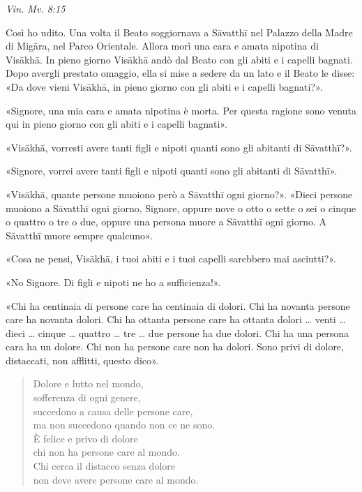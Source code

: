 \emph{Vin. Mv. 8:15}


 Così ho udito. Una volta il Beato soggiornava a Sāvatthī nel
Palazzo della Madre di Migāra, nel Parco Orientale. Allora morì una cara
e amata nipotina di Visākhā. In pieno giorno Visākhā andò dal Beato con
gli abiti e i capelli bagnati. Dopo avergli prestato omaggio, ella si
mise a sedere da un lato e il Beato le disse: «Da dove vieni Visākhā, in
pieno giorno con gli abiti e i capelli bagnati?».


«Signore, una mia cara e amata nipotina è morta. Per questa ragione sono
venuta qui in pieno giorno con gli abiti e i capelli bagnati».


«Visākhā, vorresti avere tanti figli e nipoti quanti sono gli abitanti
di Sāvatthī?».


«Signore, vorrei avere tanti figli e nipoti quanti sono gli abitanti di
Sāvatthī».


«Visākhā, quante persone muoiono però a Sāvatthī ogni giorno?». «Dieci
persone muoiono a Sāvatthī ogni giorno, Signore, oppure nove o otto o
sette o sei o cinque o quattro o tre o due, oppure una persona muore a
Sāvatthī ogni giorno. A Sāvatthī muore sempre qualcuno».


«Cosa ne pensi, Visākhā, i tuoi abiti e i tuoi capelli sarebbero mai
asciutti?».


«No Signore. Di figli e nipoti ne ho a sufficienza!».


«Chi ha centinaia di persone care ha centinaia di dolori. Chi ha novanta
persone care ha novanta dolori. Chi ha ottanta persone care ha ottanta
dolori … venti … dieci … cinque … quattro … tre … due persone ha due
dolori. Chi ha una persona cara ha un dolore. Chi non ha persone care
non ha dolori. Sono privi di dolore, distaccati, non afflitti, questo
dico».


\begin{quote}
Dolore e lutto nel mondo, \\
sofferenza di ogni genere, \\
succedono a causa delle persone care, \\
ma non succedono quando non ce ne sono. \\
È felice e privo di dolore \\
chi non ha persone care al mondo. \\
Chi cerca il distacco senza dolore \\
non deve avere persone care al mondo.
\end{quote}

